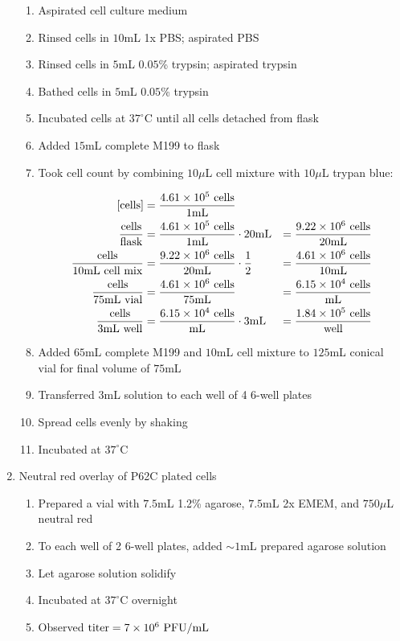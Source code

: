 \begin{enumerate}
		\begin{enumerate}
			\item Aspirated cell culture medium
			\item Rinsed cells in $10$mL 1x PBS; aspirated PBS
			\item Rinsed cells in $5$mL $0.05$\% trypsin; aspirated trypsin
			\item Bathed cells in $5$mL $0.05$\% trypsin
			\item Incubated cells at $37^{\circ}$C until all cells detached from flask
			\item Added $15$mL complete M199 to flask
			\item Took cell count by combining $10\mu$L cell mixture with $10\mu$L trypan blue:
			
				\begin{align*}
				\text{[cells]} &= \frac{4.61\times 10^{5}\text{ cells}}{1\text{mL}} \\
				\frac{\text{cells}}{\text{flask}} &= \frac{4.61\times 10^{5}\text{ cells}}{1\text{mL}} \cdot 20\text{mL} &= \frac{9.22\times 10^{6}\text{ cells}}{20\text{mL}}\\
				\frac{\text{cells}}{10\text{mL cell mix}} &= \frac{9.22\times 10^{6}\text{ cells}}{20\text{mL}}\cdot \frac{1}{2} &= \frac{4.61\times 10^{6}\text{ cells}}{10\text{mL}}\\
				\frac{\text{cells}}{75\text{mL vial}} &= \frac{4.61\times 10^{6}\text{ cells}}{75\text{mL}} &= \frac{6.15\times 10^{4}\text{ cells}}{\text{mL}}\\
				\frac{\text{cells}}{3\text{mL well}} &= \frac{6.15\times 10^{4}\text{ cells}}{\text{mL}} \cdot 3\text{mL} &= \frac{1.84\times 10^{5}\text{ cells}}{\text{well}}\\
				\end{align*}
			\item Added $65$mL complete M199 and $10$mL cell mixture to $125$mL conical vial for final volume of $75$mL
			\item Transferred $3$mL solution to each well of 4 6-well plates
			\item Spread cells evenly by shaking
			\item Incubated at $37^{\circ}$C
		\end{enumerate}
	\item Neutral red overlay of P62C plated cells
		\begin{enumerate}
			\item Prepared a vial with $7.5$mL 1.2\% agarose, $7.5$mL 2x EMEM, and $750\mu$L neutral red
			\item To each well of 2 6-well plates, added $\sim 1$mL prepared agarose solution
			\item Let agarose solution solidify
			\item Incubated at $37^{\circ}$C overnight
			\item Observed $\text{titer}=7\times 10^{6}\text{ PFU/mL}$
		\end{enumerate}
\end{enumerate}

